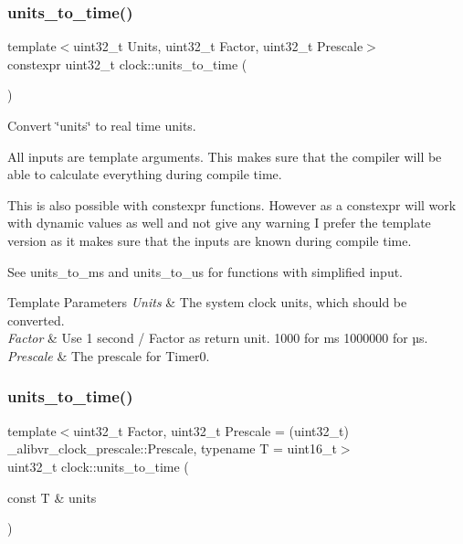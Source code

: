 \subsubsection{\texorpdfstring{units\+\_\+to\+\_\+time()}{units\_to\_time()}\hspace{0.1cm}{\footnotesize\ttfamily [1/2]}}
{\footnotesize\ttfamily template$<$uint32\+\_\+t Units, uint32\+\_\+t Factor, uint32\+\_\+t Prescale$>$ \\
constexpr uint32\+\_\+t clock\+::units\+\_\+to\+\_\+time (\begin{DoxyParamCaption}{ }\end{DoxyParamCaption})}



Convert \char`\"{}units\char`\"{} to real time units. 

All inputs are template arguments. This makes sure that the compiler will be able to calculate everything during compile time.

This is also possible with {\ttfamily constexpr} functions. However as a {\ttfamily constexpr} will work with dynamic values as well and not give any warning I prefer the template version as it makes sure that the inputs are known during compile time.

See units\+\_\+to\+\_\+ms and units\+\_\+to\+\_\+us for functions with simplified input.


\begin{DoxyTemplParams}{Template Parameters}
{\em Units} & The system clock units, which should be converted. \\
\hline
{\em Factor} & Use 1 second / Factor as return unit. 1\textquotesingle{}000 for ms 1\textquotesingle{}000\textquotesingle{}000 for µs. \\
\hline
{\em Prescale} & The prescale for {\ttfamily Timer0}. \\
\hline
\end{DoxyTemplParams}
\hypertarget{namespaceclock_afadc978b0b25983f61b85b53ae468a51}{}\label{namespaceclock_afadc978b0b25983f61b85b53ae468a51} 
\subsubsection{\texorpdfstring{units\+\_\+to\+\_\+time()}{units\_to\_time()}\hspace{0.1cm}{\footnotesize\ttfamily [2/2]}}
{\footnotesize\ttfamily template$<$uint32\+\_\+t Factor, uint32\+\_\+t Prescale = (uint32\+\_\+t) \+\_\+alibvr\+\_\+clock\+\_\+prescale\+::\+Prescale, typename T  = uint16\+\_\+t$>$ \\
uint32\+\_\+t clock\+::units\+\_\+to\+\_\+time (\begin{DoxyParamCaption}\item[{const T \&}]{units }\end{DoxyParamCaption})\hspace{0.3cm}{\ttfamily [inline]}}



